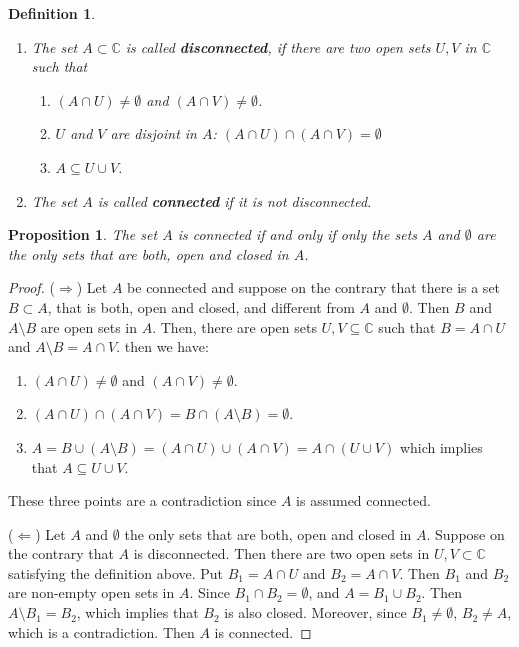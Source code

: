 \documentclass{amsart}
\newtheorem{prop}{Proposition}
\newtheorem{mydef}{Definition}
\begin{document}
\begin{mydef}
\begin{enumerate}
\item The set \(A\subset \mathbb{C}\) is called \textbf{disconnected}, if there are two open sets \(U,V\) in \(\mathbb{C}\) such that
\begin{enumerate}
\item \((A\cap U) \neq \emptyset\) and \((A\cap V) \neq \emptyset\).
\item \(U\) and \(V\) are disjoint in \(A\): \((A\cap U) \cap( A\cap  V) = \emptyset\)
\item \(A\subseteq U\cup V\).
\end{enumerate}

\item The set \(A\) is called \textbf{connected} if it is not disconnected.
\end{enumerate}
\end{mydef}

\begin{prop}
The set \(A\) is connected if and only if only the sets \(A\) and \(\emptyset\) are the only sets that are both, open and closed in \(A\).
\end{prop}
\begin{proof}
(\(\Rightarrow\)) Let \(A\) be connected and suppose on the contrary that there is a set \(B\subset A\), that is both, open and closed, and different from \(A\) and \(\emptyset\).
Then \(B\) and \(A\setminus B\) are open sets in \(A\). Then, there are open sets \(U,V\subseteq\mathbb{C}\) such that \(B = A\cap U\) and \(A\setminus B = A \cap V\).
then we have:
\begin{enumerate}
\item \((A\cap U) \neq \emptyset\) and \((A\cap V) \neq \emptyset\).
\item \((A\cap U) \cap( A\cap  V) = B \cap (A\setminus B) = \emptyset\).
\item \(A = B\cup (A\setminus B) = (A\cap U) \cup( A\cap  V) = A \cap \left( U \cup V \right)\) which implies that \(A \subseteq U\cup V\).
\end{enumerate}
These three points are a contradiction since \(A\) is assumed connected.

(\(\Leftarrow\)) Let \(A\) and \(\emptyset\) the only sets that are both, open and closed in \(A\). Suppose on the contrary that \(A\) is disconnected. Then there are two open sets in \(U,V\subset \mathbb{C}\) 
satisfying the definition above. Put \(B_1  = A\cap U\) and \(B_2 = A \cap V\). Then \(B_1\) and \(B_2\) are non-empty open sets in \(A\). Since \(B_1 \cap B_2 = \emptyset\), and \(A = B_1\cup B_2\).
Then \(A\setminus B_1 = B_2\), which implies that \(B_2\) is also closed. Moreover, since \(B_1\neq \emptyset\), \(B_2 \neq A\), which is a contradiction. Then \(A\) is connected.
\end{proof}
\end{document}
